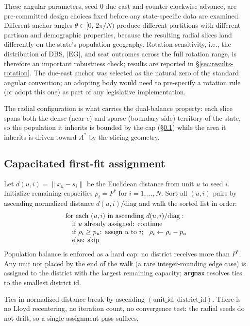 These angular parameters, seed 0 due east and counter-clockwise
advance, are pre-committed design choices fixed before any
state-specific data are examined. Different anchor angles
$\theta \in [0,\,2\pi/N)$ produce different partitions with
different partisan and demographic properties, because the resulting
radial slices land differently on the state's population geography.
Rotation sensitivity, i.e., the distribution of DBS, $|\mathrm{EG}|$,
and seat outcomes across the full rotation range, is therefore an
important robustness check; results are reported in
\S\ref{sec:results-rotation}. The due-east anchor was selected as
the natural zero of the standard angular convention; an adopting
body would need to pre-specify a rotation rule (or adopt this one)
as part of any legislative implementation.

The radial configuration is what carries the dual-balance property:
each slice spans both the dense (near-$c$) and sparse (boundary-side)
territory of the state, so the population it inherits is bounded by
the cap (\S\ref{sec:methods-assign}) while the area it inherits is
driven toward $A^*$ by the slicing geometry.

\subsection{Capacitated first-fit assignment}
\label{sec:methods-assign}

Let $d(u, i) = \|x_u - s_i\|$ be the Euclidean distance from unit $u$
to seed $i$. Initialize remaining capacities $\rho_i = P^*$ for
$i = 1, \ldots, N$. Sort all $(u, i)$ pairs by ascending normalized
distance $d(u, i) / \mathrm{diag}$ and walk the sorted list in order:
\[
  \begin{array}{l}
    \text{for each } (u, i)\text{ in ascending } d(u,i)/\mathrm{diag}: \\
    \quad \text{if $u$ already assigned: continue} \\
    \quad \text{if $\rho_i \geq p_u$: assign $u$ to $i$;\;\; }\rho_i \leftarrow \rho_i - p_u \\
    \quad \text{else: skip}
  \end{array}
\]
Population balance is enforced as a hard cap: no district receives
more than $P^*$. Any unit not placed by the end of the walk (a rare
integer-rounding edge case) is assigned to the district with the
largest remaining capacity; \texttt{argmax} resolves ties to the
smallest district id.

Ties in normalized distance break by ascending
$(\mathrm{unit\_id},\,\mathrm{district\_id})$. There is no Lloyd
recentering, no iteration count, no convergence test: the radial
seeds do not drift, so a single assignment pass suffices.

